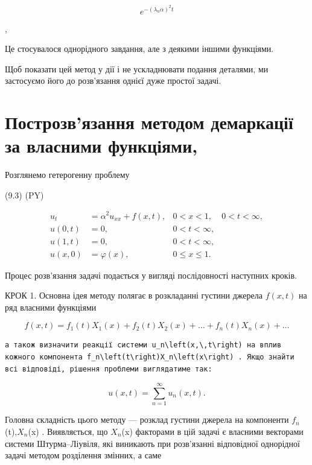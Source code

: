 \documentclass[
  ukrainian,
]{article}
\begin{document}
\[
e^{-(\lambda_n\alpha)^2 t}
\]

,

Це стосувалося однорідного завдання, але з деякими іншими функціями.

Щоб показати цей метод у дії і не ускладнювати подання деталями, ми
застосуємо його до розв'язання однієї дуже простої задачі.

\section{Построзв'язання методом демаркації за власними
функціями,}\label{ux43fux43eux441ux442ux440ux43eux437ux432ux44fux437ux430ux43dux43dux44f-ux43cux435ux442ux43eux434ux43eux43c-ux434ux435ux43cux430ux440ux43aux430ux446ux456ux457-ux437ux430-ux432ux43bux430ux441ux43dux438ux43cux438-ux444ux443ux43dux43aux446ux456ux44fux43cux438}

Розглянемо гетерогенну проблему

(9.3) (PY)

\[
\begin{aligned} u_t &= \alpha^2 u_{xx} + f(x, t), & 0 < x < 1, & 0 < t < \infty, \\ u(0, t) &= 0, & 0 < t < \infty, \\ u(1, t) &= 0, & 0 < t < \infty, \\ u(x, 0) &= \varphi(x), & 0 \leqslant x \leqslant 1. \end{aligned}
\]

Процес розв'язання задачі подається у вигляді послідовності наступних
кроків.

КРОК 1. Основна ідея методу полягає в розкладанні густини джерела
\(f(x, t)\) на ряд власними функціями

\[
f(x, t) = f_1(t) X_1(x) + f_2(t) X_2(x) + \dots + f_n(t) X_n(x) + \dots
\]

\begin{verbatim}
а також визначити реакції системи u_n\left(x,\,t\right) на вплив кожного компонента f_n\left(t\right)X_n\left(x\right) . Якщо знайти всі відповіді, рішення проблеми виглядатиме так:
\end{verbatim}

\[
u(x, t) = \sum_{n=1}^{\infty} u_n(x, t).
\]

Головна складність цього методу --- розклад густини джерела на
компоненти \(f_n\)(t),\(X_n\)(x) . Виявляється, що \(X_n\)(x) факторами
в цій задачі є власними векторами системи Штурма--Ліувіля, які виникають
при розв'язанні відповідної однорідної задачі методом розділення
змінних, а саме
\end{document}
